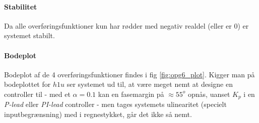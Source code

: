 \paragraph{Stabilitet}
	Da alle overføringsfunktioner kun har rødder med negativ realdel (eller er $0$)
	er systemet stabilt.
\paragraph{Bodeplot}
	Bodeplot af de 4 overføringsfunktioner findes i fig \ref{fig:opg6_plot}. Kigger
	man på bodeplottet for $h1u$ ser systemet ud til, at være meget nemt at designe
	en controller til - med et $\alpha = 0.1$ kan en fasemargin på $\approx 55^o$
	opnås, uanset $K_p$ i en \emph{P-lead} eller \emph{PI-lead} controller - men
	tages systemets ulinearitet (specielt inputbegrænsning) med i regnestykket,
	går det ikke så nemt.
	
	